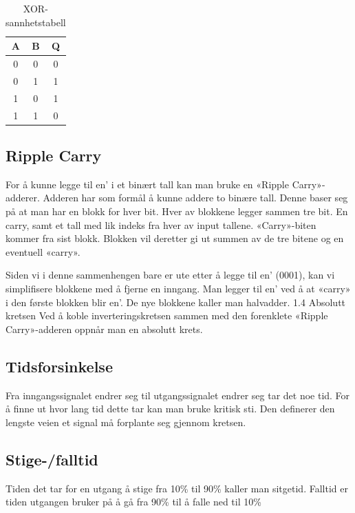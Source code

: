 \documentclass{article}
\begin{document}
\begin{table}[h]
	\centering
	\caption{XOR-sannhetstabell}
	\label{truth-label}
	\vspace{0.2cm}
	\begin{tabular}{| c | c | c |} \hline
		A & B & Q \\ \hline
		0 & 0 & 0 \\ \hline
		0 & 1 & 1 \\ \hline
		1 & 0 & 1 \\ \hline
		1 & 1 & 0 \\ \hline
	\end{tabular}
\end{table}

\subsection{Ripple Carry}
For å kunne legge til en’ i et binært tall kan man bruke en «Ripple Carry»-adderer. Adderen har som formål å kunne addere to binære tall. Denne baser seg på at man har en blokk for hver bit. Hver av blokkene legger sammen tre bit. En carry, samt et tall med lik indeks fra hver av input tallene. «Carry»-biten kommer fra sist blokk. Blokken vil deretter gi ut summen av de tre bitene og en eventuell «carry».

Siden vi i denne sammenhengen bare er ute etter å legge til en’ (0001), kan vi simplifisere blokkene med å fjerne en inngang. Man legger til en’ ved å at «carry» i den første blokken blir en’. De nye blokkene kaller man halvadder.
1.4 Absolutt kretsen
Ved å koble inverteringskretsen sammen med den forenklete «Ripple Carry»-adderen oppnår man en absolutt krets.

\subsection{Tidsforsinkelse}
Fra inngangssignalet endrer seg til utgangssignalet endrer seg tar det noe tid. For å finne ut hvor lang tid dette tar kan man bruke kritisk sti. Den definerer den lengste veien et signal må forplante seg gjennom kretsen.

\subsection{Stige-/falltid}
Tiden det tar for en utgang å stige fra 10\% til 90\% kaller man sitgetid. Falltid er tiden utgangen bruker på å gå fra 90\% til å falle ned til 10\%
\end{document}
